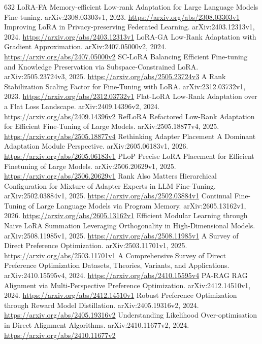 \documentclass[11pt]{article}
\begin{document}
\begin{thebibliography}{632}
 LoRA-FA Memory-efficient Low-rank Adaptation for Large Language Models Fine-tuning. arXiv:2308.03303v1, 2023. \url{https://arxiv.org/abs/2308.03303v1}
 Improving LoRA in Privacy-preserving Federated Learning. arXiv:2403.12313v1, 2024. \url{https://arxiv.org/abs/2403.12313v1}
 LoRA-GA Low-Rank Adaptation with Gradient Approximation. arXiv:2407.05000v2, 2024. \url{https://arxiv.org/abs/2407.05000v2}
 SC-LoRA Balancing Efficient Fine-tuning and Knowledge Preservation via Subspace-Constrained LoRA. arXiv:2505.23724v3, 2025. \url{https://arxiv.org/abs/2505.23724v3}
 A Rank Stabilization Scaling Factor for Fine-Tuning with LoRA. arXiv:2312.03732v1, 2023. \url{https://arxiv.org/abs/2312.03732v1}
 Flat-LoRA Low-Rank Adaptation over a Flat Loss Landscape. arXiv:2409.14396v2, 2024. \url{https://arxiv.org/abs/2409.14396v2}
 RefLoRA Refactored Low-Rank Adaptation for Efficient Fine-Tuning of Large Models. arXiv:2505.18877v4, 2025. \url{https://arxiv.org/abs/2505.18877v4}
 Rethinking Adapter Placement A Dominant Adaptation Module Perspective. arXiv:2605.06183v1, 2026. \url{https://arxiv.org/abs/2605.06183v1}
 PLoP Precise LoRA Placement for Efficient Finetuning of Large Models. arXiv:2506.20629v1, 2025. \url{https://arxiv.org/abs/2506.20629v1}
 Rank Also Matters Hierarchical Configuration for Mixture of Adapter Experts in LLM Fine-Tuning. arXiv:2502.03884v1, 2025. \url{https://arxiv.org/abs/2502.03884v1}
 Continual Fine-Tuning of Large Language Models via Program Memory. arXiv:2605.13162v1, 2026. \url{https://arxiv.org/abs/2605.13162v1}
 Efficient Modular Learning through Naive LoRA Summation Leveraging Orthogonality in High-Dimensional Models. arXiv:2508.11985v1, 2025. \url{https://arxiv.org/abs/2508.11985v1}
 A Survey of Direct Preference Optimization. arXiv:2503.11701v1, 2025. \url{https://arxiv.org/abs/2503.11701v1}
 A Comprehensive Survey of Direct Preference Optimization Datasets, Theories, Variants, and Applications. arXiv:2410.15595v4, 2024. \url{https://arxiv.org/abs/2410.15595v4}
 PA-RAG RAG Alignment via Multi-Perspective Preference Optimization. arXiv:2412.14510v1, 2024. \url{https://arxiv.org/abs/2412.14510v1}
 Robust Preference Optimization through Reward Model Distillation. arXiv:2405.19316v2, 2024. \url{https://arxiv.org/abs/2405.19316v2}
 Understanding Likelihood Over-optimisation in Direct Alignment Algorithms. arXiv:2410.11677v2, 2024. \url{https://arxiv.org/abs/2410.11677v2}

\end{thebibliography}
\end{document}
